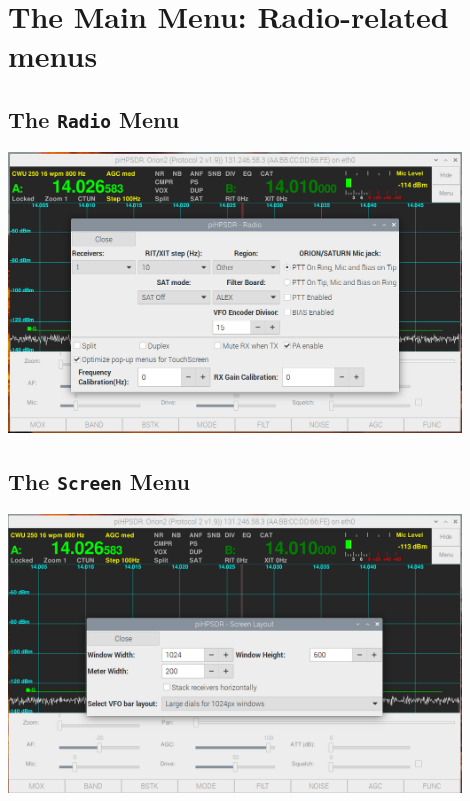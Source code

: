 \documentclass[12pt]{book}
\begin{document}
\chapter{The Main Menu: Radio-related menus}

\section{The \texttt{Radio} Menu}
\begin{center}
\includegraphics[width=12cm]{RadioMenu.png}
\end{center}

\section{The \texttt{Screen} Menu}
\begin{center}
\includegraphics[width=12cm]{ScreenMenu.png}
\end{center}
\end{document}
